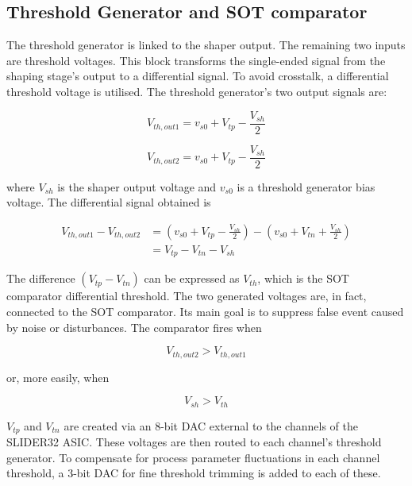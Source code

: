 
\subsection{Threshold Generator and SOT comparator} \label{thrSOT}
The threshold generator is linked to the shaper output. The remaining two inputs are threshold voltages. This block transforms the single-ended signal from the shaping stage's output to a differential signal. To avoid crosstalk, a differential threshold voltage is utilised. The threshold generator's two output signals are:

\begin{equation}
    V_{th, out1} = v_{s0} + V_{tp} - \frac{V_{sh}}{2}
\end{equation}

\begin{equation}
    V_{th, out2} = v_{s0} + V_{tp} - \frac{V_{sh}}{2}
\end{equation}

\noindent
where $V_{sh}$ is the shaper output voltage and $v_{s0}$ is a threshold generator bias voltage. The differential signal obtained is

\begin{equation}
    \begin{split}
        V_{th, out1} - V_{th, out2} & = (v_{s0} + V_{tp} - \frac{V_{sh}}{2}) - (v_{s0} + V_{tn} + \frac{V_{sh}}{2}) \\
        & = V_{tp} - V_{tn} - V_{sh}
    \end{split}
\end{equation}

The difference $(V_{tp} - V_{tn})$ can be expressed as $V_{th}$, which is the SOT comparator differential threshold. The two generated voltages are, in fact, connected to the SOT comparator. Its main goal is to suppress false event caused by noise or disturbances. The comparator fires when

\begin{equation}
    V_{th, out2} > V_{th, out1}
\end{equation}

\noindent
or, more easily, when

\begin{equation}
    V_{sh} > V_{th}
\end{equation}

\noindent
$V_{tp}$ and $V_{tn}$ are created via an 8-bit DAC external to the channels of the SLIDER32 ASIC. These voltages are then routed to each channel's threshold generator. To compensate for process parameter fluctuations in each channel threshold, a 3-bit DAC for fine threshold trimming is added to each of these.

